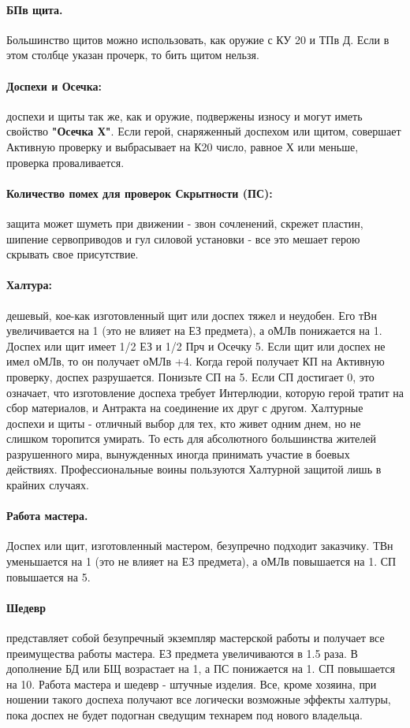 \paragraph{БПв щита.} Большинство щитов можно использовать, как оружие с КУ 20 и ТПв Д. Если в этом столбце указан прочерк, то бить щитом нельзя.
\paragraph{Доспехи и Осечка:} доспехи и щиты так же, как и оружие, подвержены износу и могут иметь свойство \textbf{"Осечка Х"}. Если герой, снаряженный доспехом или щитом, совершает Активную проверку и выбрасывает на К20 число, равное Х или меньше, проверка проваливается. 
\paragraph{Количество помех для проверок Скрытности (ПС):} защита может шуметь при движении - звон сочленений, скрежет пластин, шипение сервоприводов и гул силовой установки - все это мешает герою  скрывать свое присутствие.

\paragraph{Халтура:} дешевый, кое-как изготовленный щит или доспех тяжел и неудобен. Его тВн увеличивается на 1 (это не влияет на ЕЗ предмета), а оМЛв понижается на 1. Доспех или щит имеет 1/2 ЕЗ и 1/2 Прч и Осечку 5. Если щит или доспех не имел оМЛв, то он получает оМЛв +4. Когда герой получает КП на Активную проверку, доспех разрушается. Понизьте СП на 5. Если СП достигает 0, это означает, что изготовление доспеха требует Интерлюдии, которую герой тратит на сбор материалов, и Антракта на соединение их друг с другом.
\newline Халтурные доспехи и щиты - отличный выбор для тех, кто живет одним днем, но не слишком торопится умирать. То есть для абсолютного большинства жителей разрушенного мира, вынужденных иногда принимать участие в боевых действиях. Профессиональные воины пользуются Халтурной защитой лишь в крайних случаях.
\paragraph{Работа мастера.} Доспех или щит, изготовленный мастером, безупречно подходит заказчику. ТВн уменьшается на 1 (это не влияет на ЕЗ предмета), а оМЛв повышается на 1. СП повышается на 5.
\paragraph{Шедевр} представляет собой безупречный экземпляр мастерской работы и получает все преимущества работы мастера. ЕЗ предмета увеличиваются в 1.5 раза. В дополнение БД или БЩ возрастает на 1, а ПС понижается на 1. СП повышается на 10.
\newline Работа мастера и шедевр - штучные изделия. Все, кроме хозяина, при ношении такого доспеха получают все логически возможные эффекты халтуры, пока доспех не будет подогнан сведущим технарем под нового владельца.
